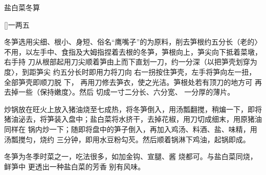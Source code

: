 \begin{recipe}{盐白菜冬算}

\ingredients

[\footnotemark]{一两五}

\preparation

\step 冬笋选用尖细、根小、身短、俗名“鹰嘴子”的为原料，削去笋根约五分长（老的〉
不用，以左手中、食指及大姆指捏着去根的冬笋，笋根向上，笋尖向下抵着菜墩，右手持
刀从根部起用刀尖顺着笋由上而下直划一刀，约一分深（以把笋壳划穿为度〉，到距笋尖
约五分长时即用力将刀向 右一拐按住笋壳，左手将笋向左一扭，全部笋壳即顺刀脱 下，
再用刀修去笋衣，使之光洁。笋根处若有顶刀的地方可 再去掉一些（保持嫩度〉。然后
切成一寸二分长、六分宽、 一分厚的薄片。

\step 炒锅放在旺火上放入猪油烧至七成热，将冬笋倒入，用汤瓢翻搅，稍煸一下，即将
猪油泌去，将笋装入盘中；盐白菜将水挤干，去掉花椒，用刀切成细末，用原猪油同样在
锅内炒一下；随即将盘中的笋子倒入，再加入鸡汤、料酒、盐、味精，用汤瓢搅匀，烧约
三分钟，即用水豆粉勾芡。然后顺着锅淋下鸡油，起锅即成。

\features

冬笋为冬季时菜之一，吃法很多，如加金钩、宣腿、酱 烧都可。与盐白菜同烧，鲜笋中
更透出一种盐白菜的芳香 别有风味。


\end{recipe}

